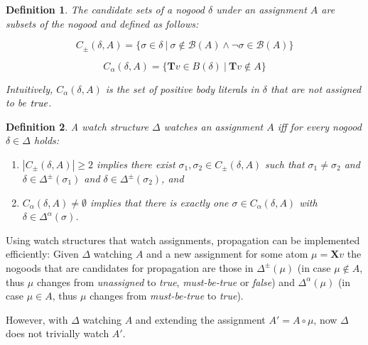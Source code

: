 \documentclass{vutinfth} %
\newtheorem{definition}{Definition}[section]
\newcommand{\mbt}{must-be-true\xspace}
\newcommand{\bass}{\mathcal{B}}
\newcommand{\ass}{A}
\newcommand{\bT}{\mathbf{T}}
\newcommand{\bX}{\mathbf{X}}
\newcommand{\cdpm}{C_\pm}
\newcommand{\cdal}{C_\alpha}
\newcommand{\dpm}{\Delta^\pm}
\newcommand{\dal}{\Delta^\alpha}
\newcommand{\lowinv}{watches\xspace}
\newcommand{\bodyf}{B}
\newcommand{\sgl}{\mu}
\newcommand{\bsgl}{\sigma}
\begin{document}
\begin{definition}
The \emph{candidate sets} of a nogood $\delta$ under an assignment $A$ are subsets of the nogood  and defined as follows:

$$\cdpm(\delta, A) = \{\bsgl \in \delta \ | \ \bsgl \not \in \bass(\ass) \wedge \neg{\bsgl} \in \bass(\ass) \}$$ %

$$\cdal(\delta, A) = \{ \bT v \in \bodyf(\delta) \ | \ \bT v \not \in \ass \}$$

Intuitively, $C_\alpha(\delta, A)$ is the set of positive body literals in $\delta$ that are not assigned to be $\emph{true}$.
\end{definition}

\begin{definition}

A watch structure $\Delta$ \emph{\lowinv} an assignment $\ass$ iff for every nogood $\delta \in \Delta$ holds:

\begin{enumerate}
\item $|\cdpm(\delta, A)| \geq 2$ implies there exist $\bsgl_1, \bsgl_2 \in \cdpm(\delta, A)$ such that $\bsgl_1 \not = \bsgl_2$ and $\delta \in \dpm(\bsgl_1)$ and $\delta \in \dpm(\bsgl_2)$, and
\item $\cdal(\delta, A) \not = \emptyset$ implies that there is exactly one $\bsgl \in \cdal(\delta, A)$ with $\delta \in \dal(\bsgl)$.
\end{enumerate}
\end{definition}

Using watch structures that watch assignments, propagation can be implemented efficiently: Given $\Delta$ watching $\ass$ and a new assignment for some atom $\sgl = \bX v$ the nogoods that are candidates for propagation are those in $\dpm(\sgl)$ (in case $\sgl \not \in A$, thus $\sgl$ changes from \emph{unassigned} to \emph{true}, \emph{\mbt} or \emph{false}) and $\dal(\sgl)$ (in case $\sgl \in A$, thus $\sgl$ changes from \emph{\mbt} to \emph{true}).

However, with $\Delta$ watching $\ass$ and extending the assignment $\ass' = \ass \circ \sgl$, now $\Delta$ does not trivially watch $\ass'$.
\end{document}
